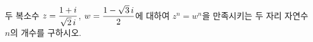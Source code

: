 두 복소수 $z=\dfrac{1+i}{\sqrt{2}\mkern3mu i}$, $w=\dfrac{1-\sqrt{3}\mkern3mu i}{2}$에 대하여 $z^n=w^n$을 만족시키는 두 자리 자연수 $n$의 개수를 구하시오.
